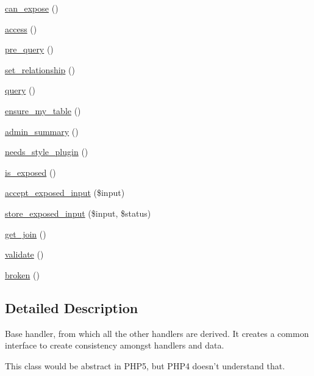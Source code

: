 \begin{CompactItemize}
\hyperlink{classviews__handler_92517d122d69dc6f64a9edb80d55057d}{can\_\-expose} ()
\item 
\hyperlink{classviews__handler_3f2fbfe1e0849d06ae77149412b821f6}{access} ()
\item 
\hyperlink{classviews__handler_4eeb5551d6c97b1ea074049991989fce}{pre\_\-query} ()
\item 
\hyperlink{classviews__handler_c54ea4553cbc678d23b51dfad3142a54}{set\_\-relationship} ()
\item 
\hyperlink{classviews__handler_91e22c95696d9fdb9ed753a10d42a21d}{query} ()
\item 
\hyperlink{classviews__handler_947f21ef0f21a77f4d103af4702b3600}{ensure\_\-my\_\-table} ()
\item 
\hyperlink{classviews__handler_27a5cb35f3f17322957730a95b6be11e}{admin\_\-summary} ()
\item 
\hyperlink{classviews__handler_53baa97a6c218ce4b847c8fb4e65a350}{needs\_\-style\_\-plugin} ()
\item 
\hyperlink{classviews__handler_0c01527c54c1f1372f3c4f28ae34a837}{is\_\-exposed} ()
\item 
\hyperlink{classviews__handler_20433153babc3196b26ee773755a709e}{accept\_\-exposed\_\-input} (\$input)
\item 
\hyperlink{classviews__handler_7f2453d86d3cb3850826e8c921012f16}{store\_\-exposed\_\-input} (\$input, \$status)
\item 
\hyperlink{classviews__handler_c05dca8ea852b137f7f288d090a49221}{get\_\-join} ()
\item 
\hyperlink{classviews__handler_323961657c7c5f3257a8fe4eeea1502f}{validate} ()
\item 
\hyperlink{classviews__handler_c1cd2ff30cb558c79cc908be516fb725}{broken} ()
\end{CompactItemize}


\subsection{Detailed Description}
Base handler, from which all the other handlers are derived. It creates a common interface to create consistency amongst handlers and data.

This class would be abstract in PHP5, but PHP4 doesn't understand that.

